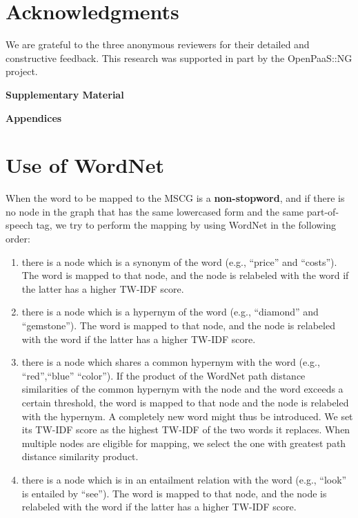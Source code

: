 \documentclass[11pt,a4paper]{article}
\begin{document}
\vspace{-0.15cm}

\section*{Acknowledgments}
We are grateful to the three anonymous reviewers for their detailed and constructive feedback. This research was supported in part by the OpenPaaS::NG project. 




\onecolumn
\newpage
\begin{center}
\textbf{\Large Supplementary Material}
\end{center}
\textbf{\Large Appendices}
\appendix
\section{Use of WordNet} \label{app:word_net}

When the word to be mapped to the MSCG is a \textbf{non-stopword}, and if there is no node in the graph that has the same lowercased form and the same part-of-speech tag, we try to perform the mapping by using WordNet in the following order:

\begin{enumerate}[label=(\roman*), leftmargin=*]
\setlength\itemsep{0em}
\item there is a node which is a synonym of the word (e.g., ``price'' and ``costs''). The word is mapped to that node, and the node is relabeled with the word if the latter has a higher TW-IDF score.

\item there is a node which is a hypernym of the word (e.g., ``diamond'' and ``gemstone''). The word is mapped to that node, and the node is relabeled with the word if the latter has a higher TW-IDF score.

\item there is a node which shares a common hypernym with the word (e.g., ``red'',``blue''  ``color''). If the product of the WordNet path distance similarities of the common hypernym with the node and the word exceeds a certain threshold, the word is mapped to that node and the node is relabeled with the hypernym. A completely new word might thus be introduced. We set its TW-IDF score as the highest TW-IDF of the two words it replaces. When multiple nodes are eligible for mapping, we select the one with greatest path distance similarity product.

\item there is a node which is in an entailment relation with the word (e.g., ``look'' is entailed by ``see''). The word is mapped to that node, and the node is relabeled with the word if the latter has a higher TW-IDF score.
\end{enumerate}
\end{document}
